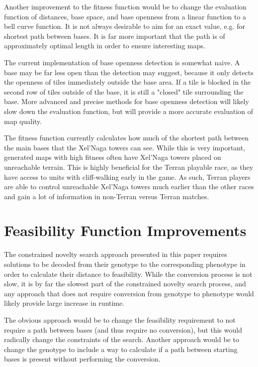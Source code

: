 Another improvement to the fitness function would be to change the evaluation function of distances, base space, and base openness from a linear function to a bell curve function. It is not always desirable to aim for an exact value, e.g. for shortest path between bases. It is far more important that the path is of approximately optimal length in order to ensure interesting maps.

The current implementation of base openness detection is somewhat naive. A base may be far less open than the detection may suggest, because it only detects the openness of tiles immediately outside the base area. If a tile is blocked in the second row of tiles outside of the base, it is still a "closed" tile surrounding the base. More advanced and precise methods for base openness detection will likely slow down the evaluation function, but will provide a more accurate evaluation of map quality.

The fitness function currently calculates how much of the shortest path between the main bases that the Xel'Naga towers can see. While this is very important, generated maps with high fitness often have Xel'Naga towers placed on unreachable terrain. This is highly beneficial for the Terran playable race, as they have access to units with cliff-walking early in the game. As such, Terran players are able to control unreachable Xel'Naga towers much earlier than the other races and gain a lot of information in non-Terran versus Terran matches.

\section{Feasibility Function Improvements}
\label{futurework_feasibility}
The constrained novelty search approach presented in this paper requires solutions to be decoded from their genotype to the corresponding phenotype in order to calculate their distance to feasibility. While the conversion process is not slow, it is by far the slowest part of the constrained novelty search process, and any approach that does not require conversion from genotype to phenotype would likely provide large increase in runtime.

The obvious approach would be to change the feasibility requirement to not require a path between bases (and thus require no conversion), but this would radically change the constraints of the search. Another approach would be to change the genotype to include a way to calculate if a path between starting bases is present without performing the conversion.
